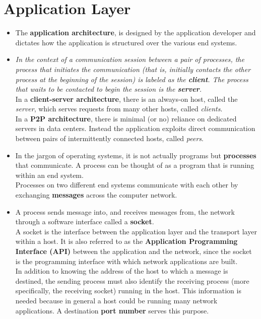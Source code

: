 \section{Application Layer}
\begin{itemize}

\item
The \textbf{application architecture}, is designed by the application developer and dictates how the application is structured over the various end systems.

\item
\textit{In the context of a communication session between a pair of processes, the process that initiates the communication (that is, initially contacts the other process at the beginning of the session) is labeled as the \textbf{client}. The process that waits to be contacted to begin the session is the \textbf{server}.}\\
In a \textbf{client-server architecture}, there is an always-on host, called the \textit{server}, which serves requests from many other hosts, called \textit{clients}.\\
In a \textbf{P2P architecture}, there is minimal (or no) reliance on dedicated servers in data centers. Instead the application exploits direct communication between pairs of intermittently connected hosts, called \textit{peers}.

\item
In the jargon of operating systems, it is not actually programs but \textbf{processes} that communicate. A process can be thought of as a program that is running within an end system.\\
Processes on two different end systems communicate with each other by exchanging \textbf{messages} across the computer network.

\item
A process sends message into, and receives messages from, the network through a software interface called a \textbf{socket}.\\
A socket is the interface between the application layer and the transport layer within a host. It is also referred to as the \textbf{Application Programming Interface (API)} between the application and the network, since the socket is the programming interface with which network applications are built.\\
In addition to knowing the address of the host to which a message is destined, the sending process must also identify the receiving process (more specifically, the receiving socket) running in the host. This information is needed because in general a host could be running many network applications. A destination \textbf{port number} serves this purpose.


\end{itemize}
